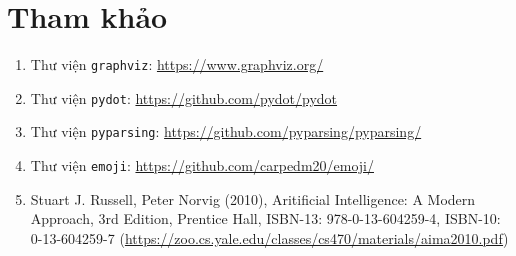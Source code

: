 \documentclass[a4paper, 11pt]{article}
\begin{document}
\section{Tham khảo}
\begin{enumerate}
    \item Thư viện \lstinline|graphviz|: \url{https://www.graphviz.org/}
    \item Thư viện \lstinline|pydot|: \url{https://github.com/pydot/pydot}
    \item Thư viện \lstinline|pyparsing|: \url{https://github.com/pyparsing/pyparsing/}
    \item Thư viện \lstinline|emoji|: \url{https://github.com/carpedm20/emoji/}
    \item Stuart J. Russell, Peter Norvig (2010), Aritificial Intelligence: A Modern Approach, 3rd Edition, Prentice Hall, ISBN-13: 978-0-13-604259-4, ISBN-10: 0-13-604259-7 (\url{https://zoo.cs.yale.edu/classes/cs470/materials/aima2010.pdf})
\end{enumerate}
\end{document}
